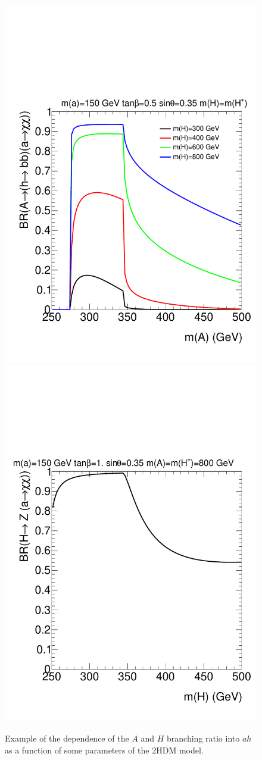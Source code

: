 \begin{figure}
\centering
\includegraphics[width=.48\textwidth]{texinputs/04_grid/figures/DMHF//brA}
\includegraphics[width=.48\textwidth]{texinputs/04_grid/figures/DMHF//brH}
\caption{Example of the dependence of the $A$ and $H$ branching ratio into $ah$ as a function of some parameters of the 2HDM model.}
\label{fig:brAHah}
\end{figure}


\FloatBarrier
